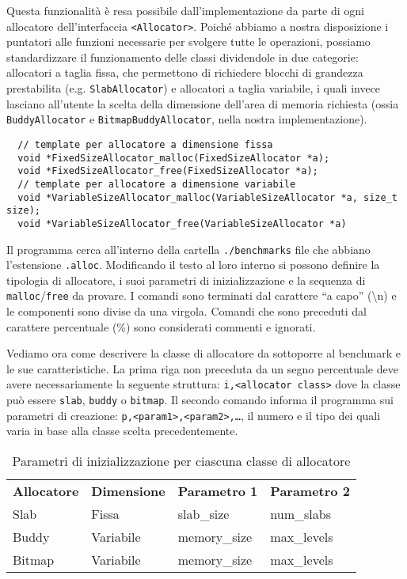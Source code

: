 Questa funzionalità è resa possibile dall’implementazione da parte di ogni allocatore dell’interfaccia \texttt{<Allocator>}. Poiché abbiamo a nostra disposizione i puntatori alle funzioni necessarie per svolgere tutte le operazioni, possiamo standardizzare il funzionamento delle classi dividendole in due categorie: allocatori a taglia fissa, che permettono di richiedere blocchi di grandezza prestabilita (e.g. \texttt{SlabAllocator}) e allocatori a taglia variabile, i quali invece lasciano all’utente la scelta della dimensione dell’area di memoria richiesta (ossia \texttt{BuddyAllocator} e \texttt{BitmapBuddyAllocator}, nella nostra implementazione).

\begin{lstlisting}
  // template per allocatore a dimensione fissa
  void *FixedSizeAllocator_malloc(FixedSizeAllocator *a);
  void *FixedSizeAllocator_free(FixedSizeAllocator *a);
  // template per allocatore a dimensione variabile
  void *VariableSizeAllocator_malloc(VariableSizeAllocator *a, size_t size);
  void *VariableSizeAllocator_free(VariableSizeAllocator *a)
\end{lstlisting}

Il programma cerca all’interno della cartella \texttt{./benchmarks} file che abbiano l’estensione \texttt{.alloc}. Modificando il testo al loro interno si possono definire la tipologia di allocatore, i suoi parametri di inizializzazione e la sequenza di \texttt{malloc}/\texttt{free} da provare. I comandi sono terminati dal carattere ``a capo'' (\textbackslash n) e le componenti sono divise da una virgola. Comandi che sono preceduti dal carattere percentuale (\%) sono considerati commenti e ignorati.

Vediamo ora come descrivere la classe di allocatore da sottoporre al benchmark e le sue caratteristiche. La prima riga non preceduta da un segno percentuale deve avere necessariamente la seguente struttura: \texttt{i,<allocator class>} dove la classe può essere \texttt{slab}, \texttt{buddy} o \texttt{bitmap}. Il secondo comando informa il programma sui parametri di creazione: \texttt{p,<param1>,<param2>,\ldots}, il numero e il tipo dei quali varia in base alla classe scelta precedentemente.

\begin{table}[H]
\centering
\begin{tabularx}{\textwidth}{|l|l|l|l|}
\textbf{Allocatore} & \textbf{Dimensione} & \textbf{Parametro 1} & \textbf{Parametro 2} \\
Slab    & Fissa     & slab\_size   & num\_slabs   \\
Buddy   & Variabile & memory\_size & max\_levels  \\
Bitmap  & Variabile & memory\_size & max\_levels  \\
\end{tabularx}
\caption{Parametri di inizializzazione per ciascuna classe di allocatore}
\end{table}

